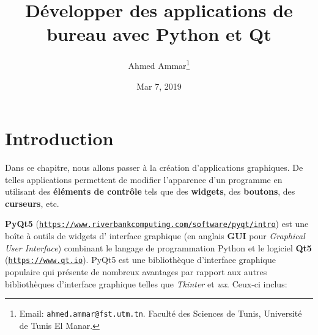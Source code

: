 \documentclass[%
oneside,                 %
final,                   %
10pt,french]{article}
\begin{document}

\newcommand{\exercisesection}[1]{\subsection*{#1}}






\title{Développer des applications de bureau avec Python et Qt}


\author{Ahmed Ammar\footnote{Email: \texttt{ahmed.ammar@fst.utm.tn}. Faculté des Sciences de Tunis, Université de Tunis El Manar.}}


\date{Mar 7, 2019}
\maketitle

\tableofcontents


\vspace{1cm} %




\section{Introduction}
Dans ce chapitre, nous allons passer à la création d’applications graphiques. De telles applications permettent de modifier l'apparence d'un programme en utilisant des \textbf{éléments de contrôle} tels que des \textbf{widgets}, des \textbf{boutons}, des \textbf{curseurs}, etc.

\textbf{PyQt5} (\href{{https://www.riverbankcomputing.com/software/pyqt/intro}}{\nolinkurl{https://www.riverbankcomputing.com/software/pyqt/intro}}) est une boîte à outils de widgets d' interface graphique (en anglais \textbf{GUI} pour \emph{Graphical User Interface}) combinant le langage de programmation Python et le logiciel \textbf{Qt5} (\href{{https://www.qt.io}}{\nolinkurl{https://www.qt.io}}). PyQt5 est une bibliothèque d'interface graphique populaire qui présente de nombreux avantages par rapport aux autres bibliothèques d'interface graphique telles que \emph{Tkinter} et \emph{wx}. Ceux-ci inclus:
\end{document}

